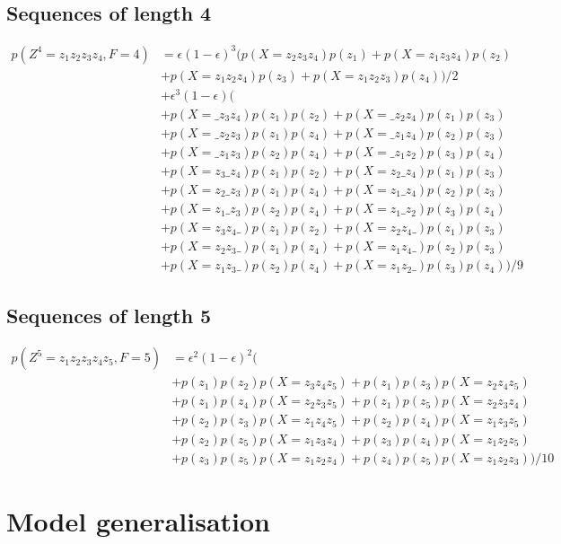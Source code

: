 \documentclass[a4paper]{article}
\theoremstyle{definition}
\theoremstyle{definition}
\theoremstyle{definition}
\newcommand{\eps}{\epsilon}
\newcommand{\s}{\texttt{\char`_}}
\begin{document}
\subsection{Sequences of length 4}

\begin{align*}
    p(Z^4=z_1z_2z_3z_4,F=4) &= \eps(1-\eps)^3 (p(X=z_2z_3z_4)p(z_1)+p(X=z_1z_3z_4)p(z_2)\\
        &+p(X=z_1z_2z_4)p(z_3)+p(X=z_1z_2z_3)p(z_4))/2\\
        &+\eps^3(1-\eps)(\\
        &+ p(X=\s z_3z_4)p(z_1)p(z_2) + p(X=\s z_2z_4)p(z_1)p(z_3)\\
        &+ p(X=\s z_2z_3)p(z_1)p(z_4) + p(X=\s z_1z_4)p(z_2)p(z_3)\\
        &+ p(X=\s z_1z_3)p(z_2)p(z_4) + p(X=\s z_1z_2)p(z_3)p(z_4)\\
        &+ p(X=z_3\s z_4)p(z_1)p(z_2) + p(X=z_2\s z_4)p(z_1)p(z_3)\\
        &+ p(X=z_2\s z_3)p(z_1)p(z_4) + p(X=z_1\s z_4)p(z_2)p(z_3)\\
        &+ p(X=z_1\s z_3)p(z_2)p(z_4) + p(X=z_1\s z_2)p(z_3)p(z_4)\\
        &+ p(X=z_3z_4\s)p(z_1)p(z_2) + p(X=z_2z_4\s)p(z_1)p(z_3)\\
        &+ p(X=z_2z_3\s)p(z_1)p(z_4) + p(X=z_1z_4\s)p(z_2)p(z_3)\\
        &+ p(X=z_1z_3\s)p(z_2)p(z_4) + p(X=z_1z_2\s)p(z_3)p(z_4))/9
\end{align*}

\subsection{Sequences of length 5}

\begin{align*}
    p(Z^5=z_1z_2z_3z_4z_5,F=5)
        &= \eps^2(1-\eps)^2(\\
        &+p(z_1)p(z_2)p(X=z_3z_4z_5)+p(z_1)p(z_3)p(X=z_2z_4z_5)\\
        &+p(z_1)p(z_4)p(X=z_2z_3z_5)+p(z_1)p(z_5)p(X=z_2z_3z_4)\\
        &+p(z_2)p(z_3)p(X=z_1z_4z_5)+p(z_2)p(z_4)p(X=z_1z_3z_5)\\
        &+p(z_2)p(z_5)p(X=z_1z_3z_4)+p(z_3)p(z_4)p(X=z_1z_2z_5)\\
        &+p(z_3)p(z_5)p(X=z_1z_2z_4)+p(z_4)p(z_5)p(X=z_1z_2z_3))/10
\end{align*}

\section{Model generalisation}
\end{document}
